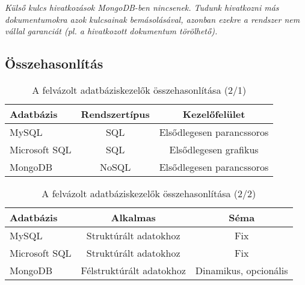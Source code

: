 \textit{Külső kulcs hivatkozások MongoDB-ben nincsenek. Tudunk hivatkozni más dokumentumokra azok kulcsainak bemásolásával, azonban ezekre a rendszer nem vállal garanciát (pl. a hivatkozott dokumentum törölhető).}


\subsection{Összehasonlítás}

\begin{table}[h]
\centering
\caption{A felvázolt adatbáziskezelők összehasonlítása (2/1)}
\label{tab:minta}
\begin{tabular}{|l|c|c|}
\hline
Adatbázis & Rendszertípus &  Kezelőfelület\\
\hline
MySQL & SQL & Elsődlegesen parancssoros\\
\hline
Microsoft SQL & SQL & Elsődlegesen grafikus\\
\hline
MongoDB & NoSQL & Elsődlegesen parancssoros\\
\hline
\end{tabular}
\end{table}

\begin{table}[h]
\centering
\caption{A felvázolt adatbáziskezelők összehasonlítása (2/2)}
\label{tab:minta}
\begin{tabular}{|l|c|c|}
\hline
Adatbázis & Alkalmas &  Séma\\
\hline
MySQL & Struktúrált adatokhoz & Fix\\
\hline
Microsoft SQL & Struktúrált adatokhoz & Fix\\
\hline
MongoDB & Félstruktúrált adatokhoz & Dinamikus, opcionális\\
\hline
\end{tabular}
\end{table}

